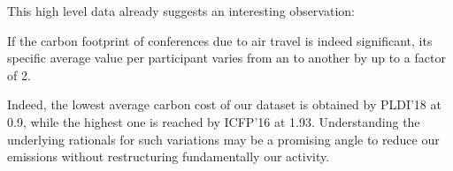 This high level data already suggests an interesting observation:
\begin{obs}
If the carbon footprint of conferences due to air travel is indeed significant,
its specific average value per participant varies from an \event to another by up
to a factor of 2.
\label{obs:footprint}
\end{obs}

Indeed, the lowest average carbon cost of our dataset is obtained by PLDI'18 at 0.9\gazunitbis,
while the highest one is reached by ICFP'16 at 1.93\gazunitbis.
Understanding the underlying rationals for such variations may be a promising
angle to reduce our emissions without restructuring fundamentally our activity.
